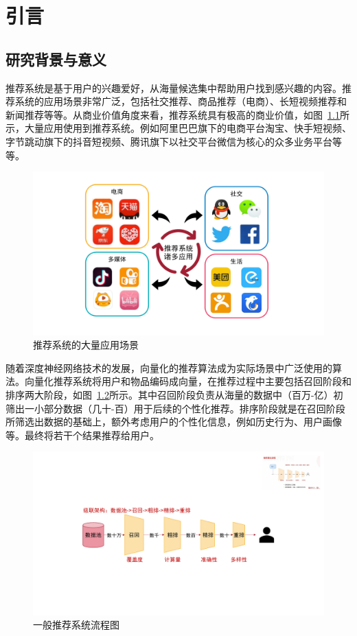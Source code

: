
\chapter{引言}

\section{研究背景与意义}
推荐系统是基于用户的兴趣爱好，从海量候选集中帮助用户找到感兴趣的内容\cite{li2020collaborative, dhelim2020personality}。推荐系统的应用场景非常广泛，包括社交推荐\cite{li2014social, tang2013social}、商品推荐（电商）\cite{zhang2012research, wu2008clustering}、长短视频推荐\cite{davidson2010youtube, hongliang2015video}和新闻推荐\cite{li2011scene, zihayat2019utility}等等。从商业价值角度来看，推荐系统具有极高的商业价值，如图~\ref{fig:apps}所示，大量应用使用到推荐系统。例如阿里巴巴旗下的电商平台淘宝\cite{gong2020edgerec}、快手短视频\cite{cai2023reinforcing}、字节跳动旗下的抖音短视频、腾讯旗下以社交平台微信为核心的众多业务平台等等。

\begin{figure}
  \centering
  \includegraphics[width=0.6\linewidth]{figures/Introduction/apps.pdf}
  \caption{推荐系统的大量应用场景}
  \label{fig:apps}
\end{figure}

随着深度神经网络技术的发展，向量化的推荐算法成为实际场景中广泛使用的算法\cite{su2020link, dhaware2020tourism, mukhopadhyay2008product}。向量化推荐系统将用户和物品编码成向量，在推荐过程中主要包括召回阶段和排序两大阶段，如图~\ref{fig:flowchart}所示。其中召回阶段负责从海量的数据中（百万-亿）初筛出一小部分数据（几十-百）用于后续的个性化推荐。排序阶段就是在召回阶段所筛选出数据的基础上，额外考虑用户的个性化信息，例如历史行为、用户画像等。最终将若干个结果推荐给用户。

\begin{figure}
  \centering
  \includegraphics[width=0.9\linewidth]{figures/Introduction/flowchart.pdf}
  \caption{一般推荐系统流程图}
  \label{fig:flowchart}
\end{figure}

